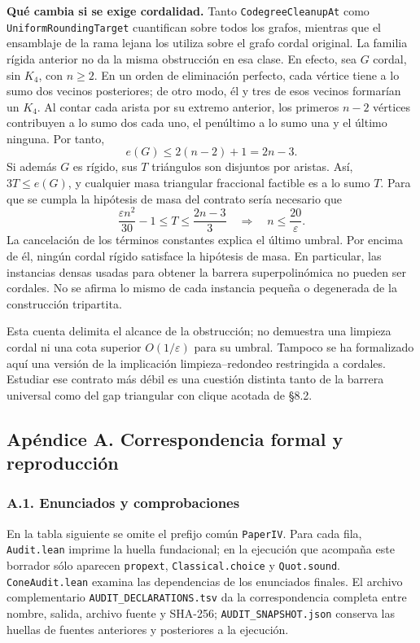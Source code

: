 \documentclass[spanish,11pt,a4paper]{article}
\begin{document}
\textbf{Qué cambia si se exige cordalidad.} Tanto \nolinkurl{CodegreeCleanupAt} como \nolinkurl{UniformRoundingTarget} cuantifican sobre todos los grafos, mientras que el ensamblaje de la rama lejana los utiliza sobre el grafo cordal original. La familia rígida anterior no da la misma obstrucción en esa clase. En efecto, sea \(G\) cordal, sin \(K_4\), con \(n\ge2\). En un orden de eliminación perfecto, cada vértice tiene a lo sumo dos vecinos posteriores; de otro modo, él y tres de esos vecinos formarían un \(K_4\). Al contar cada arista por su extremo anterior, los primeros \(n-2\) vértices contribuyen a lo sumo dos cada uno, el penúltimo a lo sumo una y el último ninguna. Por tanto, \[
e(G)\le2(n-2)+1=2n-3.
\tag{8.4}
\] Si además \(G\) es rígido, sus \(T\) triángulos son disjuntos por aristas. Así, \(3T\le e(G)\), y cualquier masa triangular fraccional factible es a lo sumo \(T\). Para que se cumpla la hipótesis de masa del contrato sería necesario que \[
\frac{\varepsilon n^2}{30}-1
\le T\le\frac{2n-3}{3}
\quad\Longrightarrow\quad n\le\frac{20}{\varepsilon}.
\tag{8.5}
\] La cancelación de los términos constantes explica el último umbral. Por encima de él, ningún cordal rígido satisface la hipótesis de masa. En particular, las instancias densas usadas para obtener la barrera superpolinómica no pueden ser cordales. No se afirma lo mismo de cada instancia pequeña o degenerada de la construcción tripartita.

Esta cuenta delimita el alcance de la obstrucción; no demuestra una limpieza cordal ni una cota superior \(O(1/\varepsilon)\) para su umbral. Tampoco se ha formalizado aquí una versión de la implicación limpieza--redondeo restringida a cordales. Estudiar ese contrato más débil es una cuestión distinta tanto de la barrera universal como del gap triangular con clique acotada de §8.2.

\subsection{Apéndice A. Correspondencia formal y reproducción}\label{apuxe9ndice-a.-correspondencia-formal-y-reproducciuxf3n}

\subsubsection{A.1. Enunciados y comprobaciones}\label{a.1.-enunciados-y-comprobaciones}

En la tabla siguiente se omite el prefijo común \nolinkurl{PaperIV}. Para cada fila, \nolinkurl{Audit.lean} imprime la huella fundacional; en la ejecución que acompaña este borrador sólo aparecen \nolinkurl{propext}, \nolinkurl{Classical.choice} y \nolinkurl{Quot.sound}. \nolinkurl{ConeAudit.lean} examina las dependencias de los enunciados finales. El archivo complementario \nolinkurl{AUDIT_DECLARATIONS.tsv} da la correspondencia completa entre nombre, salida, archivo fuente y SHA-256; \nolinkurl{AUDIT_SNAPSHOT.json} conserva las huellas de fuentes anteriores y posteriores a la ejecución.
\end{document}
